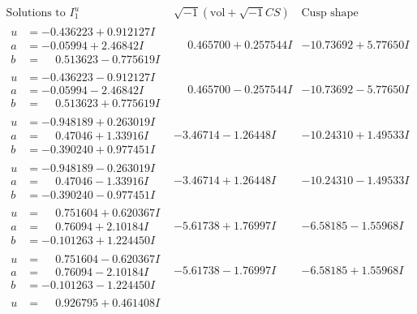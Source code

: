 \documentclass[1p]{elsarticle_modified}
\theoremstyle{definition}
\newcommand{\I}{\sqrt{-1}}
\begin{document}
$$\begin{array}{c|c|c}  
\text{Solutions to }I^u_{1}& \I (\text{vol} + \sqrt{-1}CS) & \text{Cusp shape}\\
 \hline 
\begin{aligned}
u &= -0.436223 + 0.912127 I \\
a &= -0.05994 + 2.46842 I \\
b &= \phantom{-}0.513623 - 0.775619 I\end{aligned}
 & \phantom{-}0.465700 + 0.257544 I & -10.73692 + 5.77650 I \\ \hline\begin{aligned}
u &= -0.436223 - 0.912127 I \\
a &= -0.05994 - 2.46842 I \\
b &= \phantom{-}0.513623 + 0.775619 I\end{aligned}
 & \phantom{-}0.465700 - 0.257544 I & -10.73692 - 5.77650 I \\ \hline\begin{aligned}
u &= -0.948189 + 0.263019 I \\
a &= \phantom{-}0.47046 + 1.33916 I \\
b &= -0.390240 + 0.977451 I\end{aligned}
 & -3.46714 - 1.26448 I & -10.24310 + 1.49533 I \\ \hline\begin{aligned}
u &= -0.948189 - 0.263019 I \\
a &= \phantom{-}0.47046 - 1.33916 I \\
b &= -0.390240 - 0.977451 I\end{aligned}
 & -3.46714 + 1.26448 I & -10.24310 - 1.49533 I \\ \hline\begin{aligned}
u &= \phantom{-}0.751604 + 0.620367 I \\
a &= \phantom{-}0.76094 + 2.10184 I \\
b &= -0.101263 + 1.224450 I\end{aligned}
 & -5.61738 + 1.76997 I & -6.58185 - 1.55968 I \\ \hline\begin{aligned}
u &= \phantom{-}0.751604 - 0.620367 I \\
a &= \phantom{-}0.76094 - 2.10184 I \\
b &= -0.101263 - 1.224450 I\end{aligned}
 & -5.61738 - 1.76997 I & -6.58185 + 1.55968 I \\ \hline\begin{aligned}
u &= \phantom{-}0.926795 + 0.461408 I \\

\end{aligned}
\end{array}$$
\end{document}
